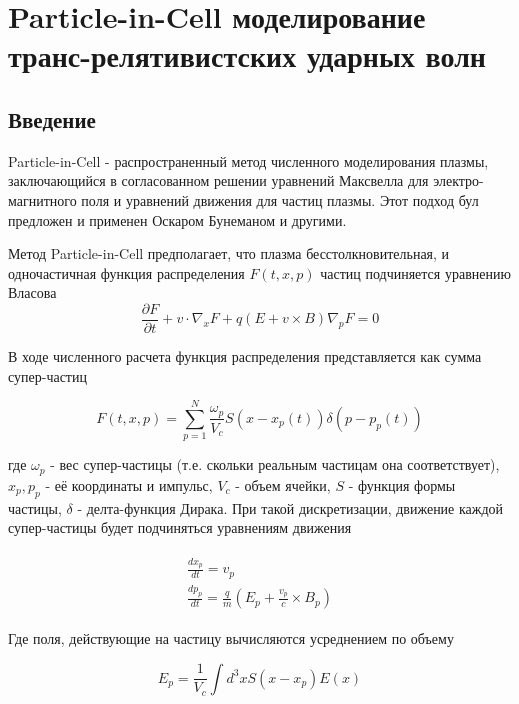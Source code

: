 \chapter{Particle-in-Cell моделирование транс-релятивистских ударных волн}\label{PIC}
\section{Введение}
Particle-in-Cell - распространенный метод численного моделирования плазмы, заключающийся в согласованном решении уравнений Максвелла для электро-магнитного поля и уравнений движения для частиц плазмы. Этот подход бул предложен и применен Оскаром Бунеманом \cite{Buneman1980} и другими.

Метод Particle-in-Cell предполагает, что плазма бесстолкновительная, и одночастичная функция распределения $F(t,x,p)$ частиц подчиняется уравнению Власова
\begin{equation} \label{Vlasov}
	\frac{\partial F}{\partial t}+v\cdot \nabla_x F + q\left(E+v\times B\right) \nabla_p F = 0
\end{equation}

В ходе численного расчета функция распределения представляется как сумма супер-частиц

\begin{equation}
	F(t,x,p) = \sum_{p=1}^{N} \frac{\omega_p}{V_c}S(x-x_p(t))\delta(p-p_p(t))
\end{equation}

где $\omega_p$ - вес супер-частицы (т.е. скольки реальным частицам она соответствует), $x_p, p_p$ - её координаты и импульс, $V_c$ - объем ячейки, $S$ - функция формы частицы, $\delta$ - делта-функция Дирака. При такой дискретизации, движение каждой супер-частицы будет подчиняться уравнениям движения

\begin{align}
\begin{split}
	\frac{dx_p}{dt}=v_p\\
	\frac{dp_p}{dt}=\frac{q}{m}\left(E_p+\frac{v_p}{c}\times B_p\right)
\end{split}
\end{align}

Где поля, действующие на частицу вычисляются усреднением по объему

\begin{equation}
	E_p = \frac{1}{V_c}\int d^3 x S(x-x_p)E(x)
\end{equation}

